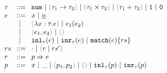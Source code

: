 \begin{figure}[h]
$\arraycolsep=4pt\begin{array}{lll}
\tau & ::= &
  \tnum ~\vert~
  \tarr{\tau_1}{\tau_2} ~\vert~
  \tprod{\tau_1}{\tau_2} ~\vert~
  \tsum{\tau_1}{\tau_2} ~\vert~
  \tunit ~\vert~
  \tvoid \\
e & ::= &
  x ~\vert~
  \hnum{n} \\
  & ~\vert~ &
  \hlam{x}{\tau}{e} ~\vert~
  \hap{e_1}{e_2} \\
  & ~\vert~ &
  \hpair{e_1}{e_2} ~\vert~
  \htriv \\
  & ~\vert~ &
  \hinl{\tau}{e} ~\vert~
  \hinr{\tau}{e} ~\vert~
  \hmatch{e}{rs} \\
rs & ::= &
  \cdot ~\vert~ \hrules{r}{rs'} \\
r & ::= &
  \hrul{p}{e} \\
p & ::= &
  x ~\vert~
  \_ ~\vert~
  \hpair{p_1}{p_2} ~\vert~
  \htriv ~\vert~
  \hinl{\tau}{p} ~\vert~
  \hinr{\tau}{p}
\end{array}$
\end{figure}

